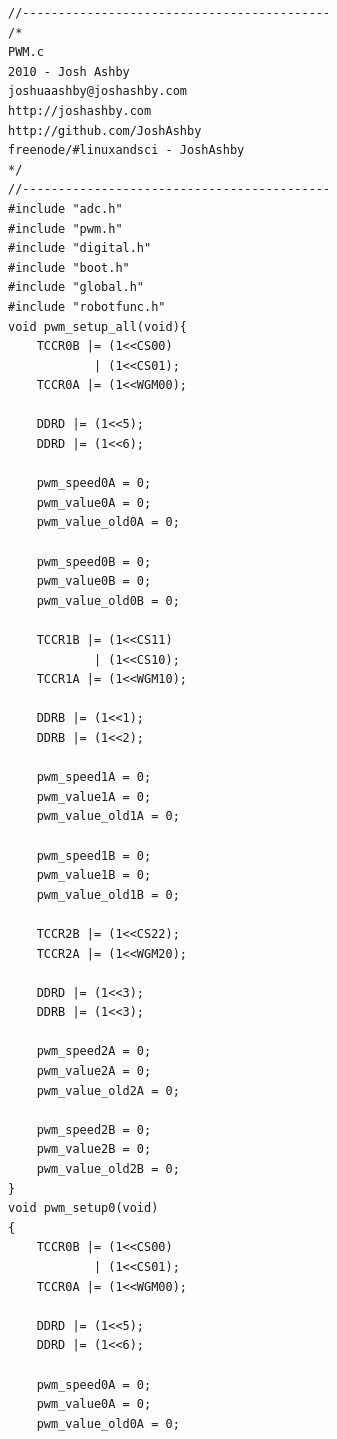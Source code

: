 \documentclass{article}
\begin{document}
\begin{lstlisting}[caption={The PWM function library.},label=pwm,frame=tbl]
//-------------------------------------------
/*
PWM.c
2010 - Josh Ashby
joshuaashby@joshashby.com
http://joshashby.com
http://github.com/JoshAshby
freenode/#linuxandsci - JoshAshby
*/
//-------------------------------------------
#include "adc.h"
#include "pwm.h"
#include "digital.h"
#include "boot.h"
#include "global.h"
#include "robotfunc.h"
void pwm_setup_all(void){
    TCCR0B |= (1<<CS00)
            | (1<<CS01);
    TCCR0A |= (1<<WGM00);

    DDRD |= (1<<5);
    DDRD |= (1<<6);

    pwm_speed0A = 0;
    pwm_value0A = 0;
    pwm_value_old0A = 0;

    pwm_speed0B = 0;
    pwm_value0B = 0;
    pwm_value_old0B = 0;

    TCCR1B |= (1<<CS11)
            | (1<<CS10);
    TCCR1A |= (1<<WGM10);

    DDRB |= (1<<1);
    DDRB |= (1<<2);

    pwm_speed1A = 0;
    pwm_value1A = 0;
    pwm_value_old1A = 0;

    pwm_speed1B = 0;
    pwm_value1B = 0;
    pwm_value_old1B = 0;

    TCCR2B |= (1<<CS22);
    TCCR2A |= (1<<WGM20);

    DDRD |= (1<<3);
    DDRB |= (1<<3);

    pwm_speed2A = 0;
    pwm_value2A = 0;
    pwm_value_old2A = 0;

    pwm_speed2B = 0;
    pwm_value2B = 0;
    pwm_value_old2B = 0;
}
void pwm_setup0(void)
{
    TCCR0B |= (1<<CS00)
            | (1<<CS01);
    TCCR0A |= (1<<WGM00);

    DDRD |= (1<<5);
    DDRD |= (1<<6);

    pwm_speed0A = 0;
    pwm_value0A = 0;
    pwm_value_old0A = 0;


\end{lstlisting}
\end{document}
